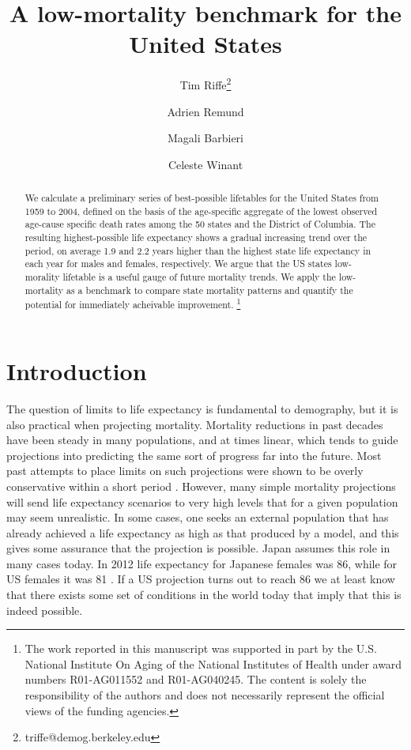 \documentclass[11pt,oneside,a4paper]{article} %
\newcommand\ackn[1]{%
  \begingroup
  \renewcommand\thefootnote{}\footnote{#1}%
  \addtocounter{footnote}{-1}%
  \endgroup
}
\begin{document}
\title{A low-mortality benchmark for the United States}

\author[1]{Tim Riffe\thanks{triffe@demog.berkeley.edu}}
\author[2,3]{Adrien Remund}
\author[3,4]{Magali Barbieri}
\author[4]{Celeste Winant}


\maketitle

\begin{abstract}
We calculate a preliminary series of best-possible lifetables for the United
States from 1959 to 2004, defined on the basis of the age-specific aggregate of
the lowest observed age-cause specific death rates among the 50
states and the District of Columbia. The resulting highest-possible life expectancy shows a gradual increasing trend over the period, on
average 1.9 and 2.2 years higher than the highest state life expectancy in each
year for males and females, respectively. We argue that the US states
low-morality lifetable is a useful gauge of future mortality trends. We apply
the low-mortality as a benchmark to compare state mortality
patterns and quantify the potential for immediately acheivable improvement.
\ackn{The work reported in this manuscript was supported in part by the U.S.
National Institute On Aging of the National Institutes of Health under award
numbers R01-AG011552 and R01-AG040245. The content is solely the responsibility of the authors and does not necessarily represent the official views of the funding agencies.}
\end{abstract}

\section*{Introduction}

The question of limits to life expectancy is fundamental to demography, but it
is also practical when projecting mortality. Mortality reductions in past
decades have been steady in many populations, and at times linear, which tends
to guide projections into predicting the same sort of progress far into the
future. Most past attempts to place limits on such projections were shown to be
overly conservative within a short period \citep{oeppen2002broken}.
However, many simple mortality projections will send life expectancy scenarios
to very high levels that for a given population may seem unrealistic. In some
cases, one seeks an external population that has already achieved a life
expectancy as high as that produced by a model, and this gives some assurance
that the projection is possible. Japan assumes this role in many cases today. In
2012 life expectancy for Japanese females was 86, while for US females it was 81
\citep{HMD}. If a US projection turns out to reach 86 we at least know that
there exists some set of conditions in the world today that imply that this is
indeed possible.
\end{document}
